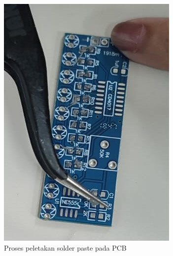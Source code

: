 
\begin{figure}[H]
  \centering
  \begin{subfigure}[b]{0.4\linewidth}
    \centering
    \includegraphics[width=\linewidth]{img/modul_2/percobaan2_solder_paste.jpg}
    \caption{Proses peletakan solder paste pada PCB\label{fig:inisub1}}
  \end{subfigure}
  \hspace{1cm}
  \begin{subfigure}[b]{0.4\linewidth}
    \centering

\end{subfigure}
\end{figure}

